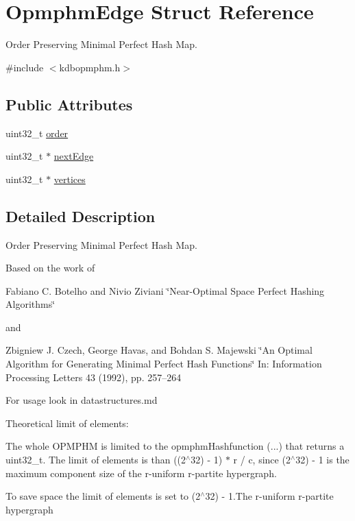 \hypertarget{structOpmphmEdge}{}\section{Opmphm\+Edge Struct Reference}
\label{structOpmphmEdge}


Order Preserving Minimal Perfect Hash Map.  




{\ttfamily \#include $<$kdbopmphm.\+h$>$}

\subsection*{Public Attributes}
\begin{DoxyCompactItemize}
\item 
uint32\+\_\+t \mbox{\hyperlink{structOpmphmEdge_a0d125d2d8a97f191896b816123c09d14}{order}}
\item 
uint32\+\_\+t $\ast$ \mbox{\hyperlink{structOpmphmEdge_a4a0e9a3d422a25a57f52530f003c3a5e}{next\+Edge}}
\item 
uint32\+\_\+t $\ast$ \mbox{\hyperlink{structOpmphmEdge_ae8d5721fe78750b17b5d4a9b8e3fc2b2}{vertices}}
\end{DoxyCompactItemize}


\subsection{Detailed Description}
Order Preserving Minimal Perfect Hash Map. 

Based on the work of

Fabiano C. Botelho and Nivio Ziviani \char`\"{}\+Near-\/\+Optimal Space Perfect Hashing Algorithms\char`\"{}

and

Zbigniew J. Czech, George Havas, and Bohdan S. Majewski \char`\"{}\+An Optimal Algorithm for Generating Minimal Perfect Hash Functions\char`\"{} In\+: Information Processing Letters 43 (1992), pp. 257–264

For usage look in datastructures.md

Theoretical limit of elements\+:

The whole O\+P\+M\+P\+HM is limited to the opmphm\+Hashfunction (...) that returns a uint32\+\_\+t. The limit of elements is than ((2$^\wedge$32) -\/ 1) $\ast$ r / c, since (2$^\wedge$32) -\/ 1 is the maximum component size of the r-\/uniform r-\/partite hypergraph.

To save space the limit of elements is set to (2$^\wedge$32) -\/ 1.\+The r-\/uniform r-\/partite hypergraph 

